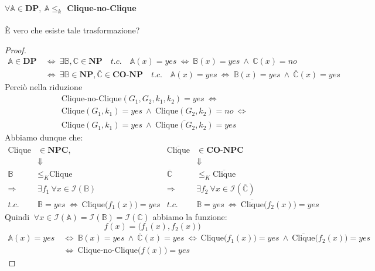 \documentclass[a4paper]{article}
\theoremstyle{definition}
\newcommand{\np}{\mathbf{NP}}
\newcommand{\npc}{\mathbf{NPC}}
\newcommand{\conp}{\mathbf{CO}\text{-}\mathbf{NP}}
\newcommand{\DP}{\mathbf{DP}}
\newcommand{\prob}[1]{\mathbb{#1}}
\newcommand{\instance}[1]{\mathcal{I}(\prob{#1})}
\begin{document}
			\paragraph{$ \forall \prob{A}\in \DP, \ \prob{A} \leq_k $ Clique-no-Clique} È vero che esiste tale trasformazione?
			\begin{proof}
				\begin{align*}
					\prob{A} \in \DP \ &\Leftrightarrow \ \exists \prob{B}, \prob{C}\in \np\quad t.c.\quad \prob{A}(x) = yes\ \Leftrightarrow\ \prob{B}(x) = yes\ \wedge\ \prob{C}(x) = no \\
					&\Leftrightarrow \ \exists \prob{B} \in \np, \overline{\prob{C}}\in \conp \quad t.c.\quad \prob{A}(x) = yes\ \Leftrightarrow\ \prob{B}(x) = yes\ \wedge\ \overline{\prob{C}}(x) = yes 
				\end{align*}
				Perciò nella riduzione
				\begin{align*}
					&\text{Clique-no-Clique}(G_1, G_2, k_1, k_2) = yes\ \Leftrightarrow\ \\
					&\text{Clique}(G_1, k_1) = yes\ \wedge\ \text{Clique}(G_2, k_2) = no\ \Leftrightarrow\ \\
					&\text{Clique}(G_1, k_1) = yes\ \wedge\ \overline{\text{Clique}(G_2, k_2)} = yes
				\end{align*}
				Abbiamo dunque che:
				\begin{align*}
					\text{Clique} &\in \npc,      & \overline{\text{Clique}} &\in \conp\mathbf{C} \\
								  & \Downarrow    &                          &\Downarrow \\
					\prob{B} &\leq_K \text{Clique}& 	 \overline{\prob{C}} &\leq_K \overline{\text{Clique}} \\
					\Rightarrow & \exists f_1\ \forall x \in \instance{\prob{B}}
												  & \Rightarrow & \exists f_2\ \forall x \in \instance{\overline{\prob{C}}} \\
					t.c.\quad & \prob{B} = yes \ \Leftrightarrow\ \text{Clique}\big(f_1(x)\big) = yes &
					t.c.\quad & \prob{B} = yes \ \Leftrightarrow\ \overline{\text{Clique}}\big(f_2(x)\big) = yes
				\end{align*}
				Quindi $ \ \forall x \in \instance{\prob{A}} = \instance{\prob{B}} = \instance{\prob{C}} $ abbiamo la funzione:
				\[
					f(x) = \big(f_1(x), f_2(x)\big)
				\]
				\begin{align*}
					\prob{A}(x) = yes\ &\Leftrightarrow\ \prob{B}(x) = yes\ \wedge \ \overline{\prob{C}}(x) = yes\ \Leftrightarrow\ \text{Clique}\big(f_1(x)\big) = yes \ \wedge \ \overline{\text{Clique}}\big(f_2(x)\big) = yes \\
					&\Leftrightarrow \ \text{Clique-no-Clique}\big(f(x)\big) = yes
				\end{align*}
			\end{proof}
			
\end{document}
